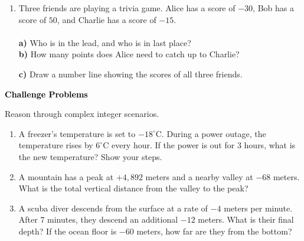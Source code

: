 \documentclass[12pt, letterpaper, fleqn]{article}
\newcommand{\blanklong}{\underline{\hspace{6.5cm}}}
\begin{document}
\vspace{3mm}
\begin{enumerate}[itemsep=2.3cm, leftmargin=0.6cm]
\item Three friends are playing a trivia game. Alice has a score of $-30$, Bob has a score of $50$, and Charlie has a score of $-15$. \\ \\
\textbf{a)} Who is in the lead, and who is in last place? \blanklong \\

\vspace{4cm}
\textbf{b)} How many points does Alice need to catch up to Charlie? \blanklong \\

\vspace{4cm}

\textbf{c)} Draw a number line showing the scores of all three friends. \\
\vspace{4cm}

\vspace{2.2cm}

\end{enumerate}

\newpage

\begin{tcolorbox}[colback=black!10]
\large\textcolor{black}{\textbf{Challenge Problems}}
\end{tcolorbox}

\noindent
Reason through complex integer scenarios.

\vspace{3mm}
\begin{enumerate}[itemsep=2.4cm, leftmargin=0.6cm]
\item A freezer's temperature is set to $-18^\circ\text{C}$. During a power outage, the temperature rises by $6^\circ\text{C}$ every hour. If the power is out for 3 hours, what is the new temperature? Show your steps.

\vspace{2.3cm}

\item A mountain has a peak at $+4,892$ meters and a nearby valley at $-68$ meters. What is the total vertical distance from the valley to the peak?

\vspace{2.3cm}

\item A scuba diver descends from the surface at a rate of $-4$ meters per minute. After 7 minutes, they descend an additional $-12$ meters. What is their final depth? If the ocean floor is $-60$ meters, how far are they from the bottom?

\vspace{2.5cm}

\end{enumerate}
\end{document}
